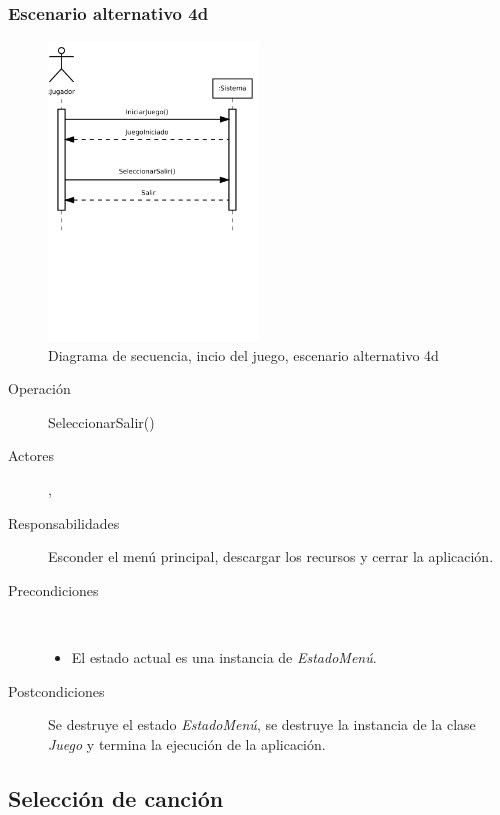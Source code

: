 \subsubsection{Escenario alternativo 4d}
\begin{figure}[h!]
  \centering
  \includegraphics[trim=0cm 10cm 0cm 0cm, clip=true, width=0.5\textwidth]{4_analisis/diagsec_caso1_esc5}
  \caption{Diagrama de secuencia, incio del juego, escenario alternativo 4d}
\end{figure}

\begin{description}
\item[Operación] SeleccionarSalir()
\item[Actores] \jugador, \sistema
\item[Responsabilidades] Esconder el menú principal, descargar los recursos y
  cerrar la aplicación.
\item[Precondiciones] $\quad$
  \begin{itemize}
  \item El estado actual es una instancia de \textit{EstadoMenú}.
  \end{itemize}
\item[Postcondiciones] Se destruye el estado \textit{EstadoMenú}, se destruye la
  instancia de la clase \textit{Juego} y termina la ejecución de la aplicación.
\end{description}

\subsection{Selección de canción}

